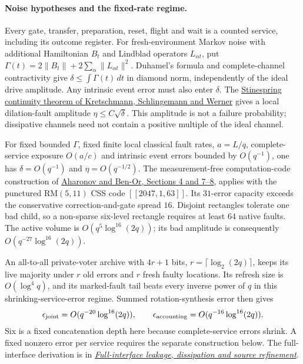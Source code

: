 \paragraph{Noise hypotheses and the fixed-rate regime.}
Every gate, transfer, preparation, reset, flight and wait is a counted
service, including its outcome register. For fresh-environment Markov
noise with additional Hamiltonian $B_t$ and Lindblad operators $L_{\alpha t}$,
put $\Gamma(t)=2\|B_t\|+2\sum_\alpha\|L_{\alpha t}\|^2$.
Duhamel's formula and complete-channel contractivity give
$\delta\le\int\Gamma(t)\,dt$ in diamond norm, independently of the
ideal drive amplitude. Any intrinsic event error must also enter $\delta$.
The
\href{https://arxiv.org/abs/quant-ph/0605009}{Stinespring continuity theorem
of Kretschmann, Schlingemann and Werner}
gives a local dilation-fault amplitude $\eta\le C\sqrt\delta$.
This amplitude is not a failure probability; dissipative channels need not
contain a positive multiple of the ideal channel.

For fixed bounded $\Gamma$, fixed finite local classical fault rates,
$a=L/q$, complete-service exposure $O(a/c)$ and intrinsic event errors
bounded by $O(q^{-1})$, one has
$\delta=O(q^{-1})$ and $\eta=O(q^{-1/2})$.
The measurement-free computation-code construction of
\href{https://arxiv.org/abs/quant-ph/9906129}{Aharonov and Ben-Or,
Sections 4 and 7--8}, applies with the punctured RM$(5,11)$ CSS code
$[[2047,1,63]]$. Its $31$-error capacity exceeds the conservative
correction-and-gate spread $16$. Disjoint rectangles tolerate one bad
child, so a non-sparse six-level rectangle requires at least $64$ native
faults. The active volume is $O(q^5\log^{16}(2q))$; its bad amplitude
is consequently $O(q^{-27}\log^{16}(2q))$.

An all-to-all private-voter archive with $4r+1$ bits, $r=\lceil\log_2(2q)\rceil$,
keeps its live majority under $r$ old errors and $r$ fresh faulty locations.
Its refresh size is $O(\log^4 q)$, and its marked-fault tail beats every
inverse power of $q$ in this shrinking-service-error regime. Summed
rotation-synthesis error then gives
\[
 \epsilon_{\rm joint}=O(q^{-20}\log^{16}(2q)),\qquad
 \epsilon_{\rm accounting}=O(q^{-16}\log^{16}(2q)).
\]
Six is a fixed concatenation depth here because complete-service errors
shrink. A fixed nonzero error per service requires the separate construction
below. The full-interface derivation is in
\href{https://github.com/FloatingPragma/observer-patch-holography/blob/r2055/docs/research/LEAKAGE_SOURCE_REFINEMENT.md}{\emph{Full-interface leakage, dissipation and source refinement}}.

